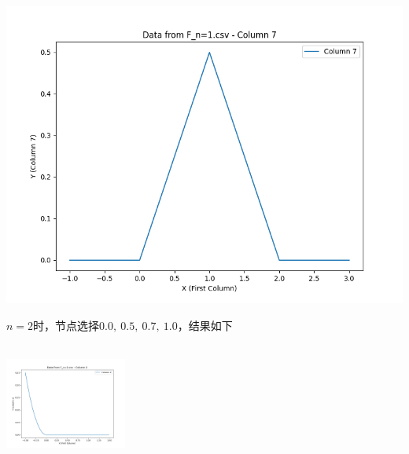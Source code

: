 \documentclass[UTF8]{ctexart}
\begin{document}
\begin{minipage}{0.3\textwidth}
	\includegraphics[width=\linewidth]{../figure/F_n=1.csv_Column_7.png} %
\end{minipage}
$n=2$时，节点选择$0.0,\ 0.5,\  0.7,\  1.0$，结果如下\\
\noindent %
\begin{minipage}{0.3\textwidth}
	\includegraphics[width=4cm, height=4cm, keepaspectratio]{../figure/F_n=2.csv_Column_2.png} %
\end{minipage}

\vspace{0.5em} %
\end{document}
